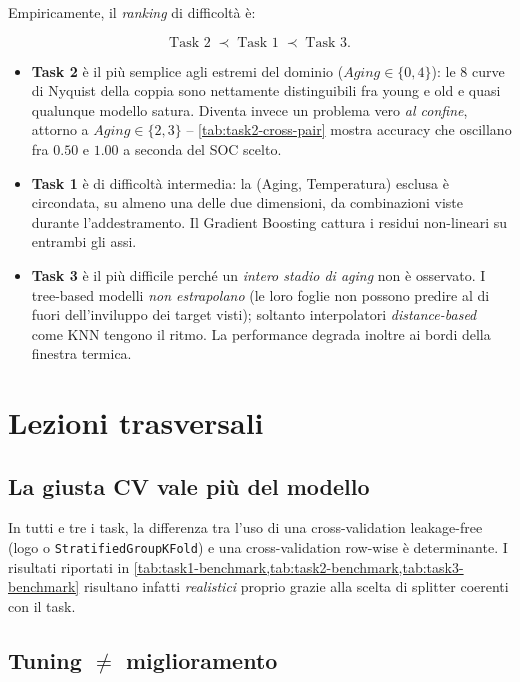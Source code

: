 Empiricamente, il \emph{ranking} di difficoltà è:

\[
\text{Task 2} \;\prec\; \text{Task 1} \;\prec\; \text{Task 3}.
\]

\begin{itemize}
  \item \textbf{Task 2} è il più semplice agli estremi del dominio
        ($Aging \in \{0, 4\}$): le 8 curve di Nyquist della coppia
        sono nettamente distinguibili fra young e old e quasi qualunque
        modello satura. Diventa invece un problema vero \emph{al
        confine}, attorno a $Aging \in \{2, 3\}$ --
        \cref{tab:task2-cross-pair} mostra accuracy che oscillano
        fra $0.50$ e $1.00$ a seconda del SOC scelto.
  \item \textbf{Task 1} è di difficoltà intermedia: la (Aging,
        Temperatura) esclusa è circondata, su almeno una delle due
        dimensioni, da combinazioni viste durante l'addestramento. Il
        Gradient Boosting cattura i residui non-lineari su entrambi gli
        assi.
  \item \textbf{Task 3} è il più difficile perché un \emph{intero stadio
        di aging} non è osservato. I tree-based modelli \emph{non
        estrapolano} (le loro foglie non possono predire al di fuori
        dell'inviluppo dei target visti); soltanto interpolatori
        \emph{distance-based} come KNN tengono il ritmo. La performance
        degrada inoltre ai bordi della finestra termica.
\end{itemize}

\section{Lezioni trasversali}

\subsection{La giusta CV vale più del modello}

In tutti e tre i task, la differenza tra l’uso di una cross-validation leakage-free (\acrshort{logo} o \texttt{StratifiedGroupKFold}) e una cross-validation row-wise è determinante. I risultati riportati in \cref{tab:task1-benchmark,tab:task2-benchmark,tab:task3-benchmark} risultano infatti \emph{realistici} proprio grazie alla scelta di splitter coerenti con il task.

\subsection{Tuning \texorpdfstring{$\neq$}{!=} miglioramento}

